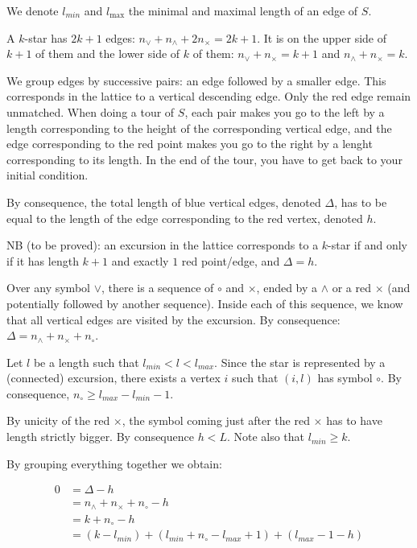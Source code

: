 \documentclass{amsart}
\theoremstyle{remark}
\begin{document}
We denote $l_{min}$ and $l_{\max}$ the minimal and maximal length of an edge of $S$.

A $k$-star has $2k+1$ edges: $n_\vee+n_\wedge+2n_\times=2k+1$. It is on the upper side of $k+1$ of them and the lower side of $k$ of them: $n_\vee+n_\times=k+1$ and $n_\wedge+n_\times=k$.

We group edges by successive pairs: an edge followed by a smaller edge. This corresponds in the lattice to a vertical descending edge. Only the red edge remain unmatched. When doing a tour of $S$, each pair makes you go to the left by a length corresponding to the height of the corresponding vertical edge, and the edge corresponding to the red point makes you go to the right by a lenght corresponding to its length. In the end of the tour, you have to get back to your initial condition.

By consequence, the total length of blue vertical edges, denoted $\Delta$, has to be equal to the length of the edge corresponding to the red vertex, denoted $h$.

NB (to be proved): an excursion in the lattice corresponds to a $k$-star if and only if it has length $k+1$ and exactly $1$ red point/edge, and $\Delta=h$.


Over any symbol $\vee$, there is a sequence of $\circ$ and $\times$, ended by a $\wedge$ or a red $\times$ (and potentially followed by another sequence). Inside each of this sequence,  we know that all vertical edges are visited by the excursion. By consequence: $\Delta=n_\wedge+n_\times+n_\circ$. 

Let $l$ be a length such that $l_{min}<l<l_{max}$. Since the star is represented by a (connected) excursion, there exists a vertex $i$ such that $(i,l)$ has symbol $\circ$. By consequence, $n_\circ\geq l_{max}-l_{min}-1$.

By unicity of the red $\times$, the symbol coming just after the red $\times$ has to have length strictly bigger. By consequence $h<L$.  Note also that $l_{min}\geq k$.

By grouping everything together we obtain:

\begin{align}
0&=\Delta-h \\
&=n_\wedge+n_\times+n_\circ-h\\
&=k+n_\circ-h\\
&=(k-l_{min})+(l_{min}+n_\circ-l_{max}+1)+(l_{max}-1-h)
\end{align}
\end{document}
